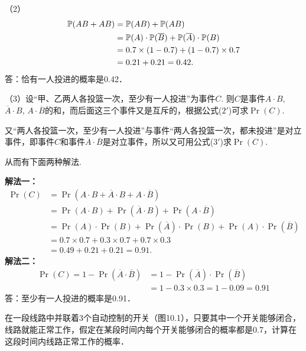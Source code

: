\begin{solution}
（2）
\[\begin{split}
    \mathbb{P}(AB+AB)&=\mathbb{P}(AB)+\mathbb{P}(AB)\\
&=\mathbb{P}(A)\cdot \mathbb{P}(\overline{B})+\mathbb{P}(\overline{A})\cdot \mathbb{P}(B)\\
&=0.7\times(1-0.7)+(1-0.7)\times0.7\\
&=0.21+0.21=0.42.    
\end{split}\]
答：恰有一人投进的概率是0.42．
\end{solution}

\begin{analyze}
（3）设“甲、乙两人各投篮一次，至少有一人投进”为事件$C$. 则$C$是事件$A\cdot B$, $\overline{A}\cdot B$, $A\cdot \overline{B}$的和，而后面这三个事件又是互斥的，根据公式($2'$)可求$\Pr(C)$.

又“两人各投篮一次，至少有一人投进”与事件“两人各投篮一次，都未投进”是对立事件，即事件$C$和事件$\overline{A}\cdot \overline{B}$是对立事件，所以又可用公式($3'$)求$\Pr(C)$.

从而有下面两种解法.    
\end{analyze}

\begin{solution}
\textbf{解法一：}\[\begin{split}
    \Pr(C)&=\Pr(A\cdot  B+\overline{A}\cdot B+A\cdot\overline{B})\\
    &=\Pr(A\cdot B)+\Pr(\overline{A}\cdot B)+\Pr(A\cdot \overline{B})\\
    &=\Pr(A)\cdot \Pr(B)+\Pr(\overline{A})\cdot \Pr(B)+\Pr(A)\cdot \Pr(\overline{B})\\
&=0.7\times0.7+0.3\times0.7+0.7\times0.3\\
&=0.49+0.21+0.21 =0.91.
\end{split}\]
\textbf{解法二：}
\[\begin{split}
    \Pr(C)=1-\Pr(\overline{A}\cdot\overline{B})
    &=1-\Pr(\overline{A})\cdot \Pr(\overline{B})\\
    &=1-0.3\times0.3=1-0.09=0.91
\end{split}\]
答：至少有一人投进的概率是0.91．
\end{solution}

\noindent
\begin{minipage}{.57\textwidth}
    \begin{example}
    在一段线路中并联着3个自动控制的开关（图10.1），只要其中一个开关能够闭合，线路就能正常工作，假定在某段时间内每个开关能够闭合的概率都是0.7，计算在这段时间内线路正常工作的概率．
\end{example}
\end{minipage}\hfill
\begin{minipage}{.4\textwidth}
    \centering
{}
\end{minipage}


